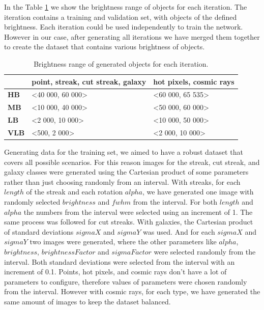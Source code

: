 In the Table \ref{table:bright} we show the brightness range of objects for each iteration. The iteration contains a training and validation set, with objects of the defined brightness. Each iteration could be used independently to train the network. However in our case, after generating all iterations we have merged them together to create the dataset that contains various brightness of objects. 

{\renewcommand{\arraystretch}{1.2}
\begin{table}[h]
\centering
    \begin{tabular}{|l|l|l|}
    \hline
     & \textbf{point, streak, cut streak, galaxy} & \textbf{hot pixels, cosmic rays} \\ \hline
    \textbf{HB}     & <40 000, 60 000>  & <60 000, 65 535> \\ \hline
    \textbf{MB}     & <10 000, 40 000>  & <50 000, 60 000> \\ \hline
    \textbf{LB}     & <2 000, 10 000>   & <10 000, 50 000> \\ \hline
    \textbf{VLB}    & <500, 2 000>      & <2 000, 10 000>  \\ \hline
    \end{tabular}
\caption{Brightness range of generated objects for each iteration.}
\label{table:bright}
\end{table}}


Generating data for the training set, we aimed to have a robust dataset that covers all possible scenarios. For this reason images for the streak, cut streak, and galaxy classes were generated using the Cartesian product of some parameters rather than just choosing randomly from an interval. With streaks, for each $length$ of the streak and each rotation $alpha$, we have generated one image with randomly selected $brightness$ and $fwhm$ from the interval. For both $length$ and $alpha$ the numbers from the interval were selected using an increment of 1. 
The same process was followed for cut streaks. 
With galaxies, the Cartesian product of standard deviations $sigmaX$ and $sigmaY$ was used. And for each $sigmaX$ and $sigmaY$ two images were generated, where the other parameters like $alpha$, $brightness$, $brightnessFactor$ and $sigmaFactor$ were selected randomly from the interval. Both standard deviations were selected from the interval with an increment of 0.1. 
Points, hot pixels, and cosmic rays don't have a lot of parameters to configure, therefore values of parameters were chosen randomly from the interval. However with cosmic rays, for each type, we have generated the same amount of images to keep the dataset balanced. 

